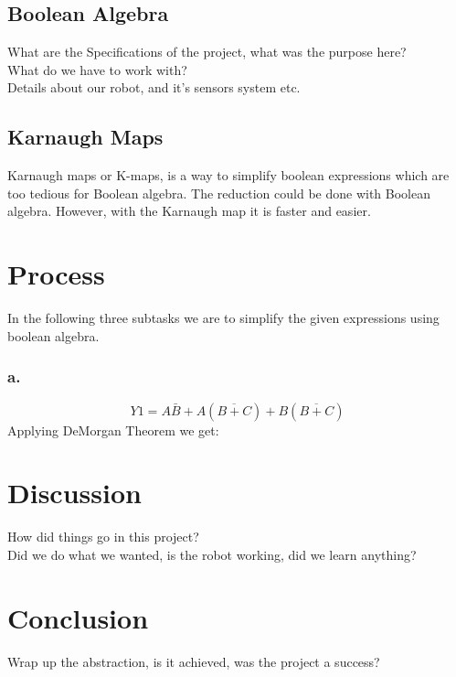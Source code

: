 \documentclass{article}
\begin{document}
\subsection*{Boolean Algebra}
What are the Specifications of the project, what was the purpose here?\\
What do we have to work with?\\
Details about our robot, and it's sensors system etc.\\


\subsection*{Karnaugh Maps}
Karnaugh maps or K-maps, is a way to simplify boolean expressions which are too tedious for Boolean algebra. The reduction could be
done with Boolean algebra. However, with the Karnaugh map it is faster and easier.

\pagebreak

 \addtocounter{section}{1}
\section*{Process}
\noindent In the following three subtasks we are to simplify the given expressions using boolean algebra.
\subsubsection*{a.} 
\[Y1= A\bar{B} + A(\overline{B+C}) + B(\overline{B+C})\]
Applying DeMorgan Theorem we get:



\pagebreak


\section*{Discussion}
 \addtocounter{section}{1}
How did things go in this project? \\
Did we do what we wanted, is the robot working, did we learn anything?\\

\section*{Conclusion}
 \addtocounter{section}{1}
Wrap up the abstraction, is it achieved, was the project a success?

\vspace{3mm}
\end{document}
